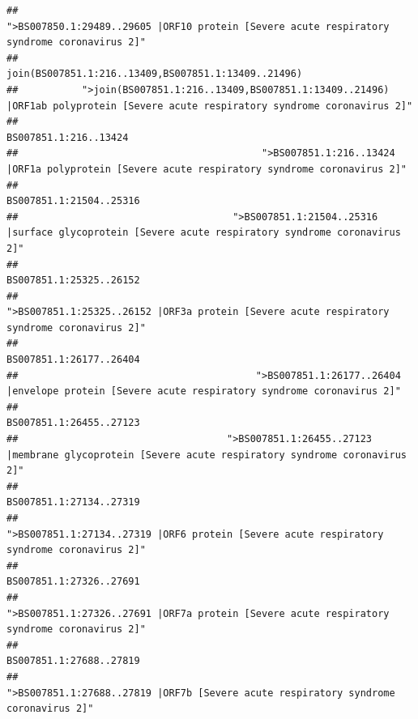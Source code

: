 \documentclass[
]{article}
\begin{document}
\begin{verbatim}
##                                            ">BS007850.1:29489..29605 |ORF10 protein [Severe acute respiratory syndrome coronavirus 2]" 
##                                                                                    join(BS007851.1:216..13409,BS007851.1:13409..21496) 
##           ">join(BS007851.1:216..13409,BS007851.1:13409..21496) |ORF1ab polyprotein [Severe acute respiratory syndrome coronavirus 2]" 
##                                                                                                                  BS007851.1:216..13424 
##                                          ">BS007851.1:216..13424 |ORF1a polyprotein [Severe acute respiratory syndrome coronavirus 2]" 
##                                                                                                                BS007851.1:21504..25316 
##                                     ">BS007851.1:21504..25316 |surface glycoprotein [Severe acute respiratory syndrome coronavirus 2]" 
##                                                                                                                BS007851.1:25325..26152 
##                                            ">BS007851.1:25325..26152 |ORF3a protein [Severe acute respiratory syndrome coronavirus 2]" 
##                                                                                                                BS007851.1:26177..26404 
##                                         ">BS007851.1:26177..26404 |envelope protein [Severe acute respiratory syndrome coronavirus 2]" 
##                                                                                                                BS007851.1:26455..27123 
##                                    ">BS007851.1:26455..27123 |membrane glycoprotein [Severe acute respiratory syndrome coronavirus 2]" 
##                                                                                                                BS007851.1:27134..27319 
##                                             ">BS007851.1:27134..27319 |ORF6 protein [Severe acute respiratory syndrome coronavirus 2]" 
##                                                                                                                BS007851.1:27326..27691 
##                                            ">BS007851.1:27326..27691 |ORF7a protein [Severe acute respiratory syndrome coronavirus 2]" 
##                                                                                                                BS007851.1:27688..27819 
##                                                    ">BS007851.1:27688..27819 |ORF7b [Severe acute respiratory syndrome coronavirus 2]" 

\end{verbatim}
\end{document}
